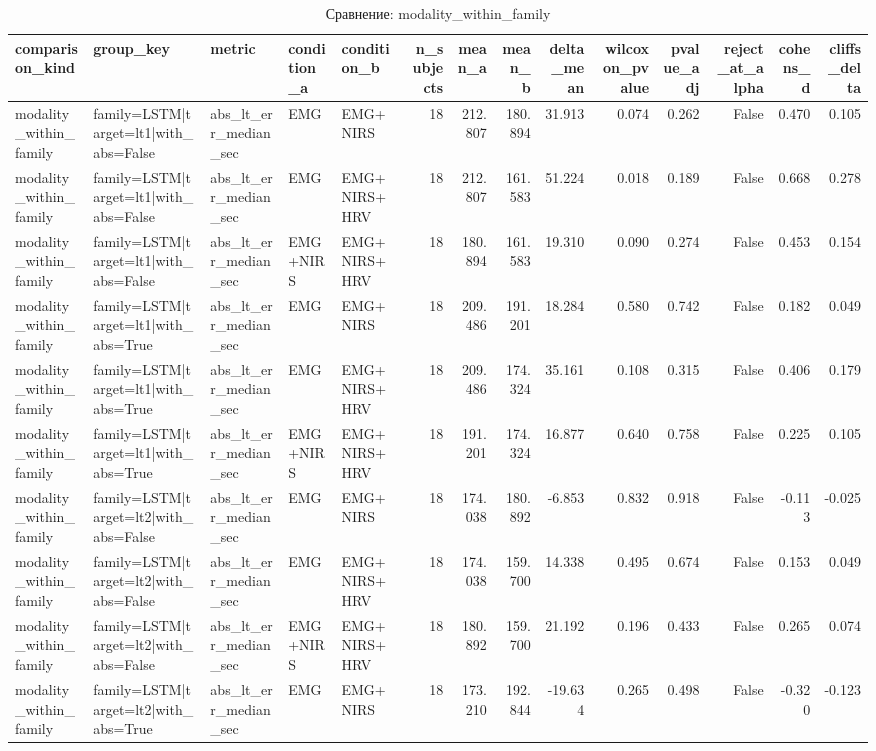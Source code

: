\begin{table}
\caption{Сравнение: modality_within_family}
\label{tab:cmp_modality_within_family}
\begin{tabular}{lllllrrrrrrrrr}
\toprule
comparison_kind & group_key & metric & condition_a & condition_b & n_subjects & mean_a & mean_b & delta_mean & wilcoxon_pvalue & pvalue_adj & reject_at_alpha & cohens_d & cliffs_delta \\
\midrule
modality_within_family & family=LSTM|target=lt1|with_abs=False & abs_lt_err_median_sec & EMG & EMG+NIRS & 18 & 212.807 & 180.894 & 31.913 & 0.074 & 0.262 & False & 0.470 & 0.105 \\
modality_within_family & family=LSTM|target=lt1|with_abs=False & abs_lt_err_median_sec & EMG & EMG+NIRS+HRV & 18 & 212.807 & 161.583 & 51.224 & 0.018 & 0.189 & False & 0.668 & 0.278 \\
modality_within_family & family=LSTM|target=lt1|with_abs=False & abs_lt_err_median_sec & EMG+NIRS & EMG+NIRS+HRV & 18 & 180.894 & 161.583 & 19.310 & 0.090 & 0.274 & False & 0.453 & 0.154 \\
modality_within_family & family=LSTM|target=lt1|with_abs=True & abs_lt_err_median_sec & EMG & EMG+NIRS & 18 & 209.486 & 191.201 & 18.284 & 0.580 & 0.742 & False & 0.182 & 0.049 \\
modality_within_family & family=LSTM|target=lt1|with_abs=True & abs_lt_err_median_sec & EMG & EMG+NIRS+HRV & 18 & 209.486 & 174.324 & 35.161 & 0.108 & 0.315 & False & 0.406 & 0.179 \\
modality_within_family & family=LSTM|target=lt1|with_abs=True & abs_lt_err_median_sec & EMG+NIRS & EMG+NIRS+HRV & 18 & 191.201 & 174.324 & 16.877 & 0.640 & 0.758 & False & 0.225 & 0.105 \\
modality_within_family & family=LSTM|target=lt2|with_abs=False & abs_lt_err_median_sec & EMG & EMG+NIRS & 18 & 174.038 & 180.892 & -6.853 & 0.832 & 0.918 & False & -0.113 & -0.025 \\
modality_within_family & family=LSTM|target=lt2|with_abs=False & abs_lt_err_median_sec & EMG & EMG+NIRS+HRV & 18 & 174.038 & 159.700 & 14.338 & 0.495 & 0.674 & False & 0.153 & 0.049 \\
modality_within_family & family=LSTM|target=lt2|with_abs=False & abs_lt_err_median_sec & EMG+NIRS & EMG+NIRS+HRV & 18 & 180.892 & 159.700 & 21.192 & 0.196 & 0.433 & False & 0.265 & 0.074 \\
modality_within_family & family=LSTM|target=lt2|with_abs=True & abs_lt_err_median_sec & EMG & EMG+NIRS & 18 & 173.210 & 192.844 & -19.634 & 0.265 & 0.498 & False & -0.320 & -0.123 \\

\end{tabular}
\end{table}
